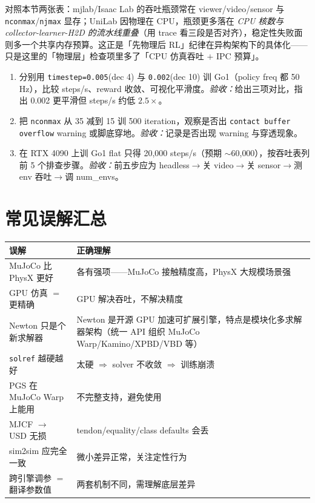 \begin{note}[三框架排查重心的位移]
对照本节两张表：mjlab/Isaac Lab 的吞吐瓶颈常在 viewer/video/sensor 与 \verb|nconmax|/\verb|njmax| 显存；UniLab 因物理在 CPU，瓶颈更多落在 \emph{CPU 核数与 collector-learner-H2D 的流水线重叠}（用 trace 看三段是否对齐），稳定性失败面则多一个共享内存预算。这正是「先物理后 RL」纪律在异构架构下的具体化——只是这里的「物理层」检查项里多了「CPU 仿真吞吐 $+$ IPC 预算」。
\end{note}

\begin{practice}[本节练习]
\begin{enumerate}
  \item 分别用 \verb|timestep=0.005|(dec 4) 与 \verb|0.002|(dec 10) 训 Go1（policy freq 都 50\,Hz），比较 steps/s、reward 收敛、可视化平滑度。\emph{验收：}给出三项对比，指出 0.002 更平滑但 steps/s 约低 $2.5\times$。
  \item 把 \verb|nconmax| 从 35 减到 15 训 500 iteration，观察是否出 \verb|contact buffer overflow| warning 或脚底穿地。\emph{验收：}记录是否出现 warning 与穿透现象。
  \item 在 RTX 4090 上训 Go1 flat 只得 20{,}000 steps/s（预期 $\sim$60{,}000），按吞吐表列前 5 个排查步骤。\emph{验收：}前五步应为 headless$\to$关 video$\to$关 sensor$\to$测 env 吞吐$\to$调 num\_envs。
\end{enumerate}
\end{practice}

\section*{常见误解汇总}
\label{sec:rlmc-phys-myths}

\begin{center}
\small
\begin{tabular}{@{}p{5.2cm}p{7.2cm}@{}}
\toprule
误解 & 正确理解 \\
\midrule
MuJoCo 比 PhysX 更好 & 各有强项——MuJoCo 接触精度高，PhysX 大规模场景强 \\
GPU 仿真 $=$ 更精确 & GPU 解决吞吐，不解决精度 \\
Newton 只是个新求解器 & Newton 是开源 GPU 加速可扩展引擎，特点是模块化多求解器架构（统一 API 组织 MuJoCo Warp/Kamino/XPBD/VBD 等） \\
\verb|solref| 越硬越好 & 太硬 $\Rightarrow$ solver 不收敛 $\Rightarrow$ 训练崩溃 \\
PGS 在 MuJoCo Warp 上能用 & 不完整支持，避免使用 \\
MJCF $\to$ USD 无损 & tendon/equality/class defaults 会丢 \\
sim2sim 应完全一致 & 微小差异正常，关注定性行为 \\
跨引擎调参 $=$ 翻译参数值 & 两套机制不同，需理解底层差异 \\
\bottomrule
\end{tabular}
\end{center}

